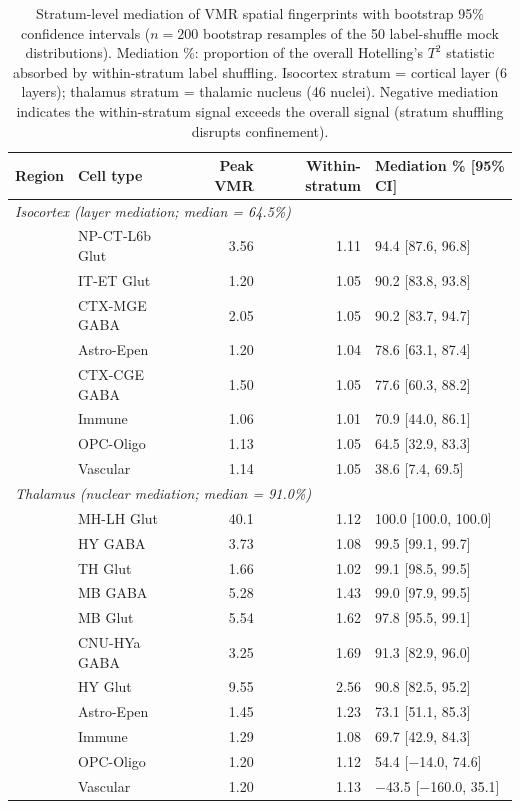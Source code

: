 \documentclass[11pt,a4paper]{article}
\begin{document}

\begin{table}[htbp]
\centering
\caption{Stratum-level mediation of VMR spatial fingerprints with bootstrap 95\% confidence intervals ($n = 200$ bootstrap resamples of the 50 label-shuffle mock distributions). Mediation \%: proportion of the overall Hotelling's $T^2$ statistic absorbed by within-stratum label shuffling. Isocortex stratum = cortical layer (6 layers); thalamus stratum = thalamic nucleus (46 nuclei). Negative mediation indicates the within-stratum signal exceeds the overall signal (stratum shuffling disrupts confinement).}
\label{tab:mediation}
\small
\begin{tabular}{llrrl}
\toprule
Region & Cell type & Peak VMR & Within-stratum & Mediation \% [95\% CI] \\
\midrule
\multicolumn{5}{l}{\textit{Isocortex (layer mediation; median = 64.5\%)}} \\
\midrule
 & NP-CT-L6b Glut & 3.56 & 1.11 & 94.4 [87.6, 96.8] \\
 & IT-ET Glut & 1.20 & 1.05 & 90.2 [83.8, 93.8] \\
 & CTX-MGE GABA & 2.05 & 1.05 & 90.2 [83.7, 94.7] \\
 & Astro-Epen & 1.20 & 1.04 & 78.6 [63.1, 87.4] \\
 & CTX-CGE GABA & 1.50 & 1.05 & 77.6 [60.3, 88.2] \\
 & Immune & 1.06 & 1.01 & 70.9 [44.0, 86.1] \\
 & OPC-Oligo & 1.13 & 1.05 & 64.5 [32.9, 83.3] \\
 & Vascular & 1.14 & 1.05 & 38.6 [7.4, 69.5] \\
\midrule
\multicolumn{5}{l}{\textit{Thalamus (nuclear mediation; median = 91.0\%)}} \\
\midrule
 & MH-LH Glut & 40.1 & 1.12 & 100.0 [100.0, 100.0] \\
 & HY GABA & 3.73 & 1.08 & 99.5 [99.1, 99.7] \\
 & TH Glut & 1.66 & 1.02 & 99.1 [98.5, 99.5] \\
 & MB GABA & 5.28 & 1.43 & 99.0 [97.9, 99.5] \\
 & MB Glut & 5.54 & 1.62 & 97.8 [95.5, 99.1] \\
 & CNU-HYa GABA & 3.25 & 1.69 & 91.3 [82.9, 96.0] \\
 & HY Glut & 9.55 & 2.56 & 90.8 [82.5, 95.2] \\
 & Astro-Epen & 1.45 & 1.23 & 73.1 [51.1, 85.3] \\
 & Immune & 1.29 & 1.08 & 69.7 [42.9, 84.3] \\
 & OPC-Oligo & 1.20 & 1.12 & 54.4 [$-$14.0, 74.6] \\
 & Vascular & 1.20 & 1.13 & $-$43.5 [$-$160.0, 35.1] \\
\bottomrule
\end{tabular}
\end{table}
\end{document}
